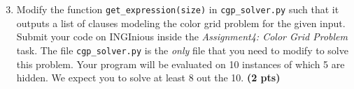 \documentclass[11pt,a4paper]{report}
\begin{document}
\begin{answers}[6cm]
\end{answers}



\begin{enumerate}
\setcounter{enumi}{2}
\item Modify the function {\tt get\_expression(size)} in \texttt{cgp\_solver.py} such that it outputs a list
of clauses modeling the color grid problem for the given input. Submit your code on INGInious inside the \emph{Assignment4: Color Grid  Problem} task. The file \texttt{cgp\_solver.py} is the \emph{only} file that you need to modify to solve this problem. Your program will be evaluated on 10 instances of which 5 are hidden. We expect you to solve at least 8 out the 10. \textbf{(2 pts)}
\end{enumerate}

\begin{answers}[3cm]
\end{answers}
\end{document}
